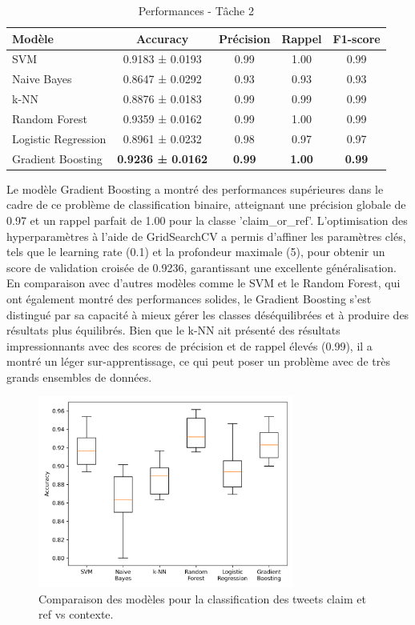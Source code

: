 \begin{table}[H]
    \centering
    \caption{Performances - Tâche 2}
    \begin{tabular}{lcccc}
        \toprule
        Modèle & Accuracy & Précision & Rappel & F1-score \\
        \midrule
        SVM & 0.9183 ± 0.0193 & 0.99 & 1.00 & 0.99 \\
        Naive Bayes & 0.8647 ± 0.0292 & 0.93 & 0.93 & 0.93 \\
        k-NN & 0.8876 ± 0.0183 & 0.99 & 0.99 & 0.99 \\
        Random Forest & 0.9359 ± 0.0162 & 0.99 & 1.00 & 0.99 \\
        Logistic Regression & 0.8961 ± 0.0232 & 0.98 & 0.97 & 0.97 \\
        Gradient Boosting & \textbf{0.9236 ± 0.0162} & \textbf{0.99} & \textbf{1.00} & \textbf{0.99} \\
        \bottomrule
    \end{tabular}\label{tab:model_comparison_clmref_context}
\end{table}

Le modèle Gradient Boosting a montré des performances supérieures dans le cadre de ce problème de classification binaire, atteignant une précision globale de 0.97 et un rappel parfait de 1.00 pour la classe 'claim\_or\_ref'.
L'optimisation des hyperparamètres à l'aide de GridSearchCV a permis d'affiner les paramètres clés, tels que le learning rate (0.1) et la profondeur maximale (5), pour obtenir un score de validation croisée de 0.9236, garantissant une excellente généralisation.
En comparaison avec d'autres modèles comme le SVM et le Random Forest, qui ont également montré des performances solides, le Gradient Boosting s'est distingué par sa capacité à mieux gérer les classes déséquilibrées et à produire des résultats plus équilibrés.
Bien que le k-NN ait présenté des résultats impressionnants avec des scores de précision et de rappel élevés (0.99), il a montré un léger sur-apprentissage, ce qui peut poser un problème avec de très grands ensembles de données.

\begin{figure}[H]
    \centering
    \includegraphics[width=0.75\textwidth]{images/model_comparison_2}
    \caption{Comparaison des modèles pour la classification des tweets claim et ref vs contexte.}
    \label{fig:model_comparison_clmref_context}
\end{figure}

